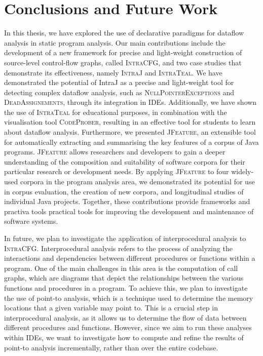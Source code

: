 \section{Conclusions and Future Work}%
\label{sec:kappa:conclusions}%
In this thesis, we have explored the use of declarative paradigms for
dataflow analysis in static program analysis. Our main contributions include the
development of a new framework for precise and light-weight construction of source-level
control-flow graphs, called \textsc{IntraCFG}, and two case studies that demonstrate
its effectiveness, namely \textsc{IntraJ} and \textsc{IntraTeal}. 
We have demonstrated the potential of IntraJ as a precise and light-weight tool
for detecting complex dataflow analysis, such as \textsc{NullPointerExceptions} and \textsc{DeadAssignements},
through its integration in IDEs. Additionally, we have shown the use of \textsc{IntraTeal}
for educational purposes, in combination with the visualisation tool \textsc{CodeProber},
resulting in an effective tool for students to learn about dataflow analysis. 
Furthermore, we presented  \textsc{JFeature}, an extensible tool for automatically 
extracting and summarising the key features of a corpus of Java programs. 
\textsc{JFeature} allows researchers and developers to gain a deeper understanding of the composition and 
suitability of software corpora for their particular research or development needs. 
By applying \textsc{JFeature} to four widely-used corpora in the program analysis area, 
we demonstrated its potential for use in corpus evaluation, the creation of new 
corpora, and longitudinal studies of individual Java projects. 
Together, these contributions provide frameworks and practiva tools practical tools 
for improving the development and maintenance of software systems.


In future, we plan to investigate the application of interprocedural analysis
to \textsc{IntraCFG}. Interprocedural analysis refers to the process of analyzing 
the interactions and dependencies between different procedures or functions within a
program. One of the main challenges in this area is the computation of call graphs,
which are diagrams that depict the relationships between the various functions and 
procedures in a program.
To achieve this, we plan to investigate the use of point-to analysis, which is a 
technique used to determine the memory locations that a given variable may point to. 
This is a crucial step in interprocedural analysis, as it allows us to determine 
the flow of data between different procedures and functions. However, since we aim 
to run these analyses within IDEs, we want to investigate how to compute and refine 
the results of point-to analysis incrementally, rather than over the entire codebase.


